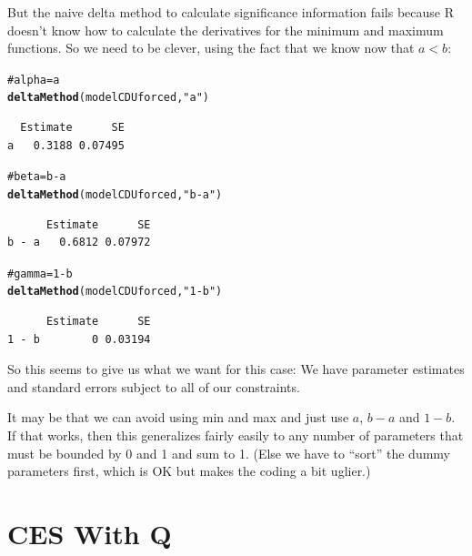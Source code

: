 \documentclass[preprint,authoryear,12pt]{elsarticle}\usepackage{graphicx, color}
\makeatletter
\newcommand{\hlfunctioncall}[1]{\textcolor[rgb]{0.501960784313725,0,0.329411764705882}{\textbf{#1}}}%
\newcommand{\hlstring}[1]{\textcolor[rgb]{0.6,0.6,1}{#1}}%
\newcommand{\hlcomment}[1]{\textcolor[rgb]{0.180392156862745,0.6,0.341176470588235}{#1}}%
\newenvironment{kframe}{%
 \def\at@end@of@kframe{}%
 \ifinner\ifhmode%
  \def\at@end@of@kframe{\end{minipage}}%
  \begin{minipage}{\columnwidth}%
 \fi\fi%
 \def\FrameCommand##1{\hskip\@totalleftmargin \hskip-\fboxsep
 \colorbox{shadecolor}{##1}\hskip-\fboxsep
     \hskip-\linewidth \hskip-\@totalleftmargin \hskip\columnwidth}%
 \MakeFramed {\advance\hsize-\width
   \@totalleftmargin\z@ \linewidth\hsize
   \@setminipage}}%
 {\par\unskip\endMakeFramed%
 \at@end@of@kframe}
\newenvironment{knitrout}{}{} %
\makeatother
\begin{document}
But the naive delta method to calculate significance information fails because R doesn't know how to calculate the derivatives for the minimum and maximum functions.  So we need to be clever, using the fact that we know now that $a < b$:
\begin{knitrout}
\color{fgcolor}\begin{kframe}
\begin{alltt}
\hlcomment{# alpha = a}
\hlfunctioncall{deltaMethod}( modelCDUforced, \hlstring{"a"})
\end{alltt}
\begin{verbatim}
  Estimate      SE
a   0.3188 0.07495
\end{verbatim}
\begin{alltt}
\hlcomment{# beta = b - a}
\hlfunctioncall{deltaMethod}( modelCDUforced, \hlstring{"b-a"})
\end{alltt}
\begin{verbatim}
      Estimate      SE
b - a   0.6812 0.07972
\end{verbatim}
\begin{alltt}
\hlcomment{# gamma = 1-b}
\hlfunctioncall{deltaMethod}( modelCDUforced, \hlstring{"1-b"})
\end{alltt}
\begin{verbatim}
      Estimate      SE
1 - b        0 0.03194
\end{verbatim}
\end{kframe}
\end{knitrout}


So this seems to give us what we want for this case:  We have parameter estimates and standard errors subject to all of our constraints.  

It may be that we can avoid using min and max and just
use $a$, $b-a$ and $1-b$.  If that works, then this generalizes fairly easily to any number of parameters that must be bounded by 0 and 1 and sum to 1.  (Else we have to ``sort'' the dummy parameters first, which is OK but makes the coding a bit uglier.)

\section{CES With Q}
\end{document}
